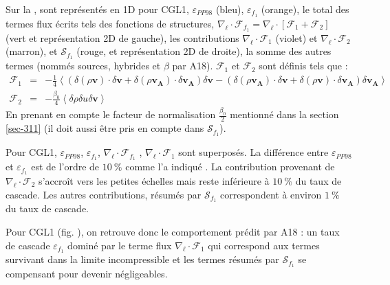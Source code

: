 Sur la , sont représentés en 1D pour CGL1, $\varepsilon_{PP98}$ (bleu), $\varepsilon_{f_1}$ (orange), le total des termes flux écrits tels des fonctions de structures, $\nabla_{\boldsymbol{\ell}} \cdot \mathcal{F}_{f_1} = \nabla_{\boldsymbol{\ell}} \cdot \left[\mathcal{F}_1 + \mathcal{F}_2\right] $ (vert et représentation 2D de gauche), les contributions $\nabla_{\boldsymbol{\ell}} \cdot \mathcal{F}_1$ (violet) et $\nabla_{\boldsymbol{\ell}} \cdot \mathcal{F}_2$ (marron), et $\mathcal{S}_{f_1}$ (rouge, et représentation 2D de droite), la somme des autres termes (nommés sources, hybrides et $\beta$ par A18). $\mathcal{F}_1 $ et $ \mathcal{F}_2$ sont définis tels que :
\begin{eqnarray}
    \mathcal{F}_1  &=& -\frac{1}{4} \left< \left(\delta \left(\rho\boldsymbol{v}\right) \cdot \delta \boldsymbol{v}+ \delta \left(\rho\boldsymbol{v_A}\right) \cdot \delta \boldsymbol{v_A} \right)\delta \boldsymbol{v}  -\left(\delta \left(\rho\boldsymbol{v_A}\right) \cdot \delta \boldsymbol{v}  + \delta \left(\rho\boldsymbol{v}\right) \cdot \delta \boldsymbol{v_A}  \right) \delta \boldsymbol{v_A} \right> \qquad\\
    \mathcal{F}_2 &=& - \frac{\beta_0}{4} \left< \delta \rho \delta u \delta \boldsymbol{v}\right>
\end{eqnarray}
En prenant en compte le facteur de normalisation $\frac{\beta_0}{2}$ mentionné dans la section \ref{sec-311} (il doit aussi être pris en compte dans $\mathcal{S}_{f_1}$). 

 Pour CGL1, $\varepsilon_{PP98}$, $\varepsilon_{f_1}$, $\nabla_{\boldsymbol{\ell}} \cdot \mathcal{F}_{f_1}$ ,  $\nabla_{\boldsymbol{\ell}} \cdot \mathcal{F}_1$  sont superposés. La différence entre  $\varepsilon_{PP98}$ et $\varepsilon_{f_1}$ est de l'ordre de $\SI{10}{\%}$ comme l'a indiqué \cite{ferrand_fluid_2021}. La contribution provenant de $\nabla_{\boldsymbol{\ell}} \cdot \mathcal{F}_2$ s'accroît vers les petites échelles mais reste inférieure à $\SI{10}{\%}$ du taux de cascade. Les autres contributions, résumés par $\mathcal{S}_{f_1}$ correspondent à environ $\SI{1}{\%}$ du taux de cascade. %

Pour CGL1 (fig. ), on retrouve donc le comportement prédit par A18 : un taux de cascade  $\varepsilon_{f_1}$ dominé par le terme flux $\nabla_{\boldsymbol{\ell}} \cdot \mathcal{F}_1$ qui correspond aux termes survivant dans la limite incompressible et les termes résumés par $\mathcal{S}_{f_1}$ se compensant pour devenir négligeables. 


